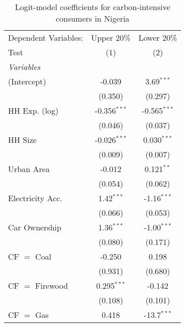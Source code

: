 
\begin{table}[htbp!]
   \centering
   \small
   \begin{adjustbox}{width = 1\textwidth, max height = 0.95\textheight, center}
      \begin{threeparttable}[b]
         \caption{\label{tab:Logit_1_NGA} Logit-model coefficients for carbon-intensive consumers in Nigeria}
         \begin{tabular}{lcc}
            \tabularnewline \midrule \midrule
            Dependent Variables: & Upper 20\%     & Lower 20\%\\   
            Test                 & (1)            & (2)\\  
            \midrule
            \emph{Variables}\\
            (Intercept)          & -0.039         & 3.69$^{***}$\\   
                                 & (0.350)        & (0.297)\\   
            HH Exp. (log)        & -0.356$^{***}$ & -0.565$^{***}$\\   
                                 & (0.046)        & (0.037)\\   
            HH Size              & -0.026$^{***}$ & 0.030$^{***}$\\   
                                 & (0.009)        & (0.007)\\   
            Urban Area           & -0.012         & 0.121$^{**}$\\   
                                 & (0.054)        & (0.062)\\   
            Electricity Acc.     & 1.42$^{***}$   & -1.16$^{***}$\\   
                                 & (0.066)        & (0.053)\\   
            Car Ownership        & 1.36$^{***}$   & -1.00$^{***}$\\   
                                 & (0.080)        & (0.171)\\   
            CF $=$ Coal          & -0.250         & 0.198\\   
                                 & (0.931)        & (0.680)\\   
            CF $=$ Firewood      & 0.295$^{***}$  & -0.142\\   
                                 & (0.108)        & (0.101)\\   
            CF $=$ Gas           & 0.418          & -13.7$^{***}$\\   

\end{tabular}
\end{threeparttable}
\end{adjustbox}
\end{table}
